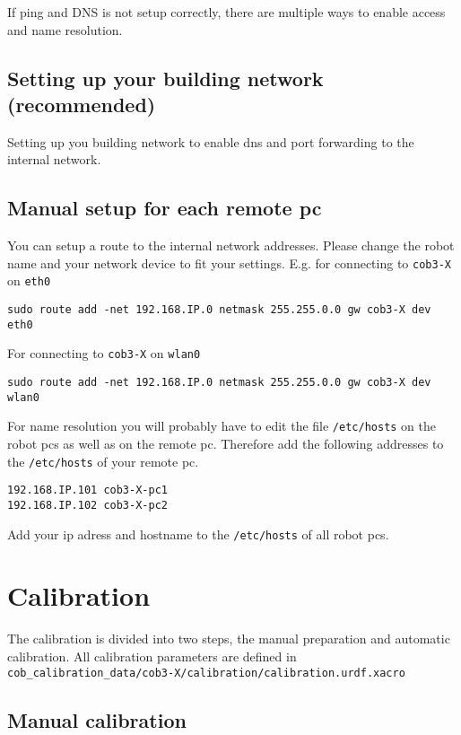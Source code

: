 If ping and DNS is not setup correctly, there are multiple ways to enable access and name resolution.

\subsection{Setting up your building network (recommended)}
Setting up you building network to enable dns and port forwarding to the internal network.

\subsection{Manual setup for each remote pc}
You can setup a route to the internal network addresses. Please change the robot name and your network device to fit your settings. E.g. for connecting to \texttt{cob3-X} on \texttt{eth0}
\begin{lstlisting}
sudo route add -net 192.168.IP.0 netmask 255.255.0.0 gw cob3-X dev eth0
\end{lstlisting}

For connecting to \texttt{cob3-X} on \texttt{wlan0}
\begin{lstlisting}
sudo route add -net 192.168.IP.0 netmask 255.255.0.0 gw cob3-X dev wlan0
\end{lstlisting}


For name resolution you will probably have to edit the file \texttt{/etc/hosts} on the robot pcs as well as on the remote pc. Therefore add the following addresses to the \texttt{/etc/hosts} of your remote pc.
\begin{lstlisting}
192.168.IP.101 cob3-X-pc1
192.168.IP.102 cob3-X-pc2
\end{lstlisting}

Add your ip adress and hostname to the \texttt{/etc/hosts} of all robot pcs.

\section{Calibration}
The calibration is divided into two steps, the manual preparation and automatic calibration. All calibration parameters are defined in \texttt{cob\_calibration\_data/cob3-X/calibration/calibration.urdf.xacro}

\subsection{Manual calibration}\label{sec:manual_calibration}

